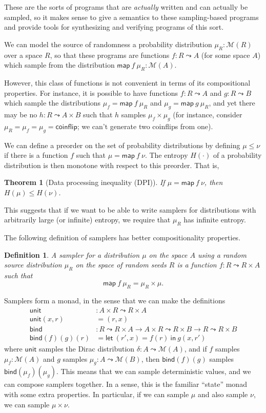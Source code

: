 \documentclass{article}           %
\newtheorem{definition}{Definition}
\newtheorem{theorem}{Theorem}
\newcommand{\map}[2]{\mathsf{map}\ {#1}\ {#2}}
\newcommand{\Dist}[1]{\mathcal{M}({#1})}
\newcommand{\coinflip}{\mathsf{coinflip}}
\begin{document}
These are the sorts of programs that are \emph{actually} written and can actually be sampled, so it makes sense to give a semantics to these sampling-based programs and provide tools for synthesizing and verifying programs of this sort.

We can model the source of randomness a probability distribution $\mu_R : \Dist{R}$ over a space $R$, so that these programs are functions $f : R \leadsto A$ (for some space $A$) which sample from the distribution $\map{f}{\mu_R} : \Dist{A}$.

However, this class of functions is not convenient in terms of its compositional properties. For instance, it is possible to have functions $f : R \leadsto A$ and $g : R \leadsto B$ which sample the distributions $\mu_f = \map{f}{\mu_R}$ and $\mu_g = \map{g}{\mu_R}$, and yet there may be no $h : R \leadsto A \times B$ such that $h$ samples $\mu_f \times \mu_g$ (for instance, consider $\mu_R = \mu_f = \mu_g = \coinflip$; we can't generate two coinflips from one).

We can define a preorder on the set of probability distributions by defining $\mu \le \nu$ if there is a function $f$ such that $\mu = \map{f}{\nu}$. The entropy $H(\cdot)$ of a probability distribution is then monotone with respect to this preorder. That is,
\begin{theorem}[Data processing inequality (DPI)]
If $\mu = \map{f}{\nu}$, then $H(\mu) \le H(\nu)$.
\end{theorem}
This suggests that if we want to be able to write samplers for distributions with arbitrarily large (or infinite) entropy, we require that $\mu_R$ has infinite entropy.

The following definition of samplers has better compositionality properties.
\begin{definition}
A \emph{sampler} for a distribution $\mu$ on the space $A$ using a random source distribution $\mu_R$ on the space of random seeds $R$ is a function $ f : R \leadsto R \times A$ such that
\[
  \mathsf{map}\ f \ \mu_R = \mu_R \times \mu.
\]
\end{definition}

Samplers form a monad, in the sense that we can make the definitions
\begin{align*}
\mathsf{unit} &: A \times R \leadsto R \times A
\\ \mathsf{unit}(x, r) &= (r, x)
\\ \mathsf{bind} &: R \leadsto R \times A \to A \times R \leadsto R \times B
  \to R \leadsto R \times B
\\ \mathsf{bind}(f)(g)(r) &= \mathsf{let}\ (r', x) = f(r)\ \mathsf{in}\ g(x, r')
\end{align*}
where $\mathsf{unit}$ samples the Dirac distribution $\delta : A \leadsto \Dist{A}$,
and if $f$ samples $\mu_f : \Dist{A}$ and $g$ samples $\mu_g : A \leadsto \Dist{B}$, then $\mathsf{bind}(f)(g)$ samples $\mathsf{bind}(\mu_f)(\mu_g)$. This means that we can sample deterministic values, and we can compose samplers together. In a sense, this is the familiar ``state'' monad with some extra properties. In particular, if we can sample $\mu$ and also sample $\nu$, we can sample $\mu \times \nu$.
\end{document}
